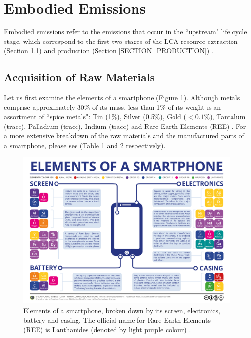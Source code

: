 \documentclass{article}
\begin{document}
\cleardoublepage
\section{Embodied Emissions} \label{SECTION_EMBODIED_EMISSIONS}
Embodied emissions refer to the emissions that occur in the ``upstream" life cycle stage, which correspond to the first two stages of the LCA resource extraction (Section \ref{SECTION_ACQUISITION_RAW_MATERIALS}) and production (Section \ref{SECTION_PRODUCTION}) \cite{teehan2013comparing}. 

\subsection{Acquisition of Raw Materials} \label{SECTION_ACQUISITION_RAW_MATERIALS}
Let us first examine the elements of a smartphone (Figure \ref{ELements_Of_Smartphone}). Although metals comprise approximately 30\% of its mass, less than 1\% of its weight is an assortment of ``spice metals": Tin (1\%), Silver (0.5\%), Gold ($<0.1\%$), Tantalum (trace), Palladium (trace), Indium (trace) and Rare Earth Elements (REE) \cite{bournay2006vital, compoundinterest2014, reller2009mobile}. For a more extensive breakdown of the raw materials and the manufactured parts of a smartphone, please see \cite{andrae2015life} (Table 1 and 2 respectively). 

\begin{figure}[h]
    \includegraphics[width=.95 \textwidth]{./images/elements_of_smartphone.png}
    \centering
    \caption{Elements of a smartphone, broken down by its screen, electronics, battery and casing. The official name for Rare Earth Elements (REE) is Lanthanides (denoted by light purple colour) \cite{compoundinterest2014}.}
    \label{ELements_Of_Smartphone}
\end{figure}
\end{document}
